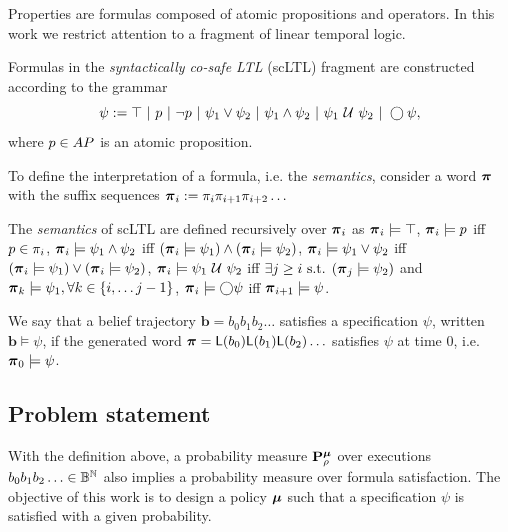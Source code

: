 \documentclass{ifacconf}
\begin{document}
Properties are formulas composed of atomic propositions and operators. In this work we restrict attention to a fragment of linear temporal logic.
\begin{definition}
  \label{def:gdtl-syntax}
  Formulas in the \emph{syntactically co-safe LTL} (scLTL) fragment are constructed according to the grammar
  \begin{equation*}
    \label{eq:scLTL}
    \psi :=  \True \ |\ p \ |\ \notltl p \ |\ \psi_1 \vee\psi_2  \ |\ \psi_1 \andltl \psi_2 \ |\ \psi_1 \Until \psi_2 \ |\ \Next \psi,
  \end{equation*}
  where $p\in {AP}$ is an atomic proposition.
\end{definition}

To define the interpretation of a formula, i.e. the \emph{semantics}, consider a word ${\boldsymbol{\pi}}$ with the suffix sequences ${\boldsymbol{\pi}}_i:= \pi_i \pi_{i+1} \pi_{i+2} \ldots$

\begin{definition}
 The \emph{semantics} of scLTL are defined recursively  over ${\boldsymbol{\pi}}_i$ as
    ${\boldsymbol{\pi}}_i \models \top$,
    ${\boldsymbol{\pi}}_i \models p$ iff $p \in \pi_i$,
    ${\boldsymbol{\pi}}_i \models \psi_1 \wedge  \psi_2  $ iff $ ( {\boldsymbol{\pi}}_i \models \psi_1 ) \wedge ( {\boldsymbol{\pi}}_i \models \psi_2 ) $,
    ${\boldsymbol{\pi}}_i \models \psi_1 \vee  \psi_2  $ iff $ ( {\boldsymbol{\pi}}_i \models \psi_1 ) \vee ( {\boldsymbol{\pi}}_i \models \psi_2 ) $,
    ${\boldsymbol{\pi}}_i \models  \psi_1 \ \mathcal{U}\  \psi_2 $ iff $\exists j \geq i \text{ s.t. } ({\boldsymbol{\pi}}_j \models \psi_2 ) $ and ${\boldsymbol{\pi}}_k \models \psi_1, \forall k \in \{i, \ldots j-1\}$,
    ${\boldsymbol{\pi}}_i \models \bigcirc \psi$ iff ${\boldsymbol{\pi}}_{i+1} \models \psi$.
\end{definition}

We say that a belief trajectory $\mathbf{b} = b_0 b_1 b_2 \ldots$ satisfies a specification $\psi$, written $\mathbf{b} \models \psi$, if the generated word ${\boldsymbol{\pi}} =\mathsf{L}(b_0) \mathsf{L}(b_1) \mathsf{L}(b_2) \ldots$ satisfies $\psi$ at time 0, i.e. ${\boldsymbol{\pi}}_0 \models \psi$.


\subsection{Problem statement}

With the definition above, a probability measure $\mathbf{P}_\rho^{\boldsymbol{\mu}}$ over executions $b_0 b_1 b_2 \ldots\in \mathbb{B}^{\mathbb N}$ also implies a probability measure over formula satisfaction. The objective of this work is to design a policy ${\boldsymbol{\mu}}$ such that a specification $\psi$ is satisfied with a given probability.
\end{document}
